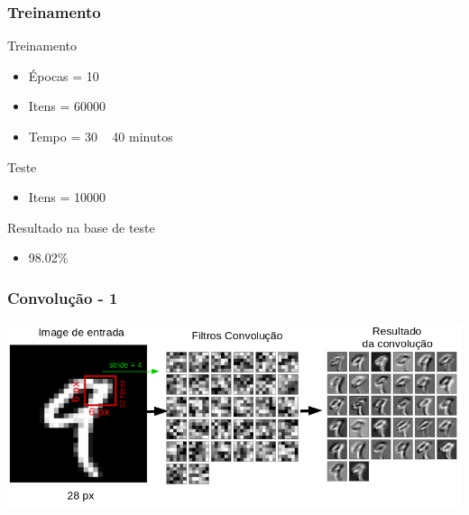 \documentclass[tikz,10pt]{beamer}
\begin{document}
\begin{frame}
	\frametitle{Treinamento}
	\centering
		\centering
		\par Treinamento
		\begin{itemize}
			\item Épocas = 10
			\item Itens = 60000
			\item Tempo = 30 ~ 40 minutos
		\end{itemize}		
	\centering
	\par Teste
	\begin{itemize}
		\item Itens = 10000
	\end{itemize}		
	\centering
	\par Resultado na base de teste
	\begin{itemize}
		\item 98.02\%
	\end{itemize}

\end{frame}

\begin{frame}
	\frametitle{Convolução - 1}
	\centering
	\includegraphics[width=.8\paperwidth]{images/fabio/conv_1}
\end{frame}
\end{document}
